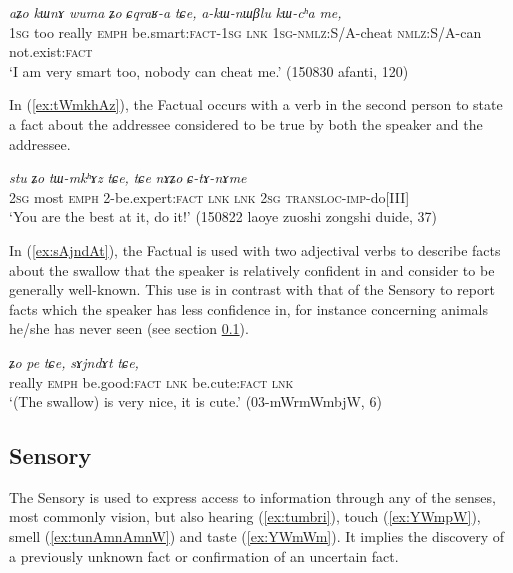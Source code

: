 \documentclass[oldfontcommands,oneside,a4paper,11pt]{article}
\newcommand{\ipa}[1]{{\phon\textit{#1}}} %
\newcommand{\refb}[1]{(\ref{#1})}
\begin{document}
\begin{exe}
\ex \label{ex:CqraRa}
\gll
\ipa{aʑo} 	\ipa{kɯnɤ} 	\ipa{wuma} 	\ipa{ʑo} 	\ipa{ɕqraʁ-a} 	\ipa{tɕe,} 	\ipa{a-kɯ-nɯβlu} 	\ipa{kɯ-cʰa} \ipa{me,}  \\
\textsc{1sg} too really \textsc{emph} be.smart:\textsc{fact-1sg} \textsc{lnk} \textsc{1sg}-\textsc{nmlz}:S/A-cheat \textsc{nmlz}:S/A-can not.exist:\textsc{fact} \\
\glt `I am very smart too, nobody can cheat me.' (150830 afanti, 120)
\end{exe}

In \refb{ex:tWmkhAz}, the Factual occurs with a verb in the second person to state a fact about the addressee considered to be true by both the speaker and the addressee.

\begin{exe}
\ex \label{ex:tWmkhAz}
\gll \ipa{nɤʑo} 	\ipa{stu} 	\ipa{ʑo} 	\ipa{tɯ-mkʰɤz} 	\ipa{tɕe,} 	\ipa{tɕe} 	\ipa{nɤʑo} 	\ipa{ɕ-tɤ-nɤme} \\
\textsc{2sg} most \textsc{emph} 2-be.expert:\textsc{fact}   \textsc{lnk} \textsc{lnk} \textsc{2sg} \textsc{transloc-imp}-do[III] \\
\glt `You are the best at it, do it!' (150822 laoye zuoshi zongshi duide, 37)
\end{exe}

In \refb{ex:sAjndAt}, the Factual is used with two adjectival verbs to describe facts about the swallow that the speaker is relatively confident in and consider to be generally well-known. This use is in contrast with that of the Sensory to report facts which the speaker has less confidence in, for instance concerning animals he/she has never seen (see section \ref{sec:sensory}).

\begin{exe}
\ex \label{ex:sAjndAt}
\gll	\ipa{wuma} 	\ipa{ʑo} 	\ipa{pe} 	\ipa{tɕe,} 	\ipa{sɤjndɤt} 	\ipa{tɕe,} \\
really  \textsc{emph} be.good:\textsc{fact} \textsc{lnk}  be.cute:\textsc{fact} \textsc{lnk} \\
\glt `(The swallow) is very nice, it is cute.' (03-mWrmWmbjW, 6)
\end{exe}


\subsection{Sensory} \label{sec:sensory}
The Sensory is used to express access to information through any of the senses, most commonly vision, but also hearing (\ref{ex:tumbri}), touch (\ref{ex:YWmpW}), smell (\ref{ex:tunAmnAmnW}) and taste (\ref{ex:YWmWm}). It implies the discovery of a previously unknown fact or confirmation of an uncertain fact.
\end{document}
